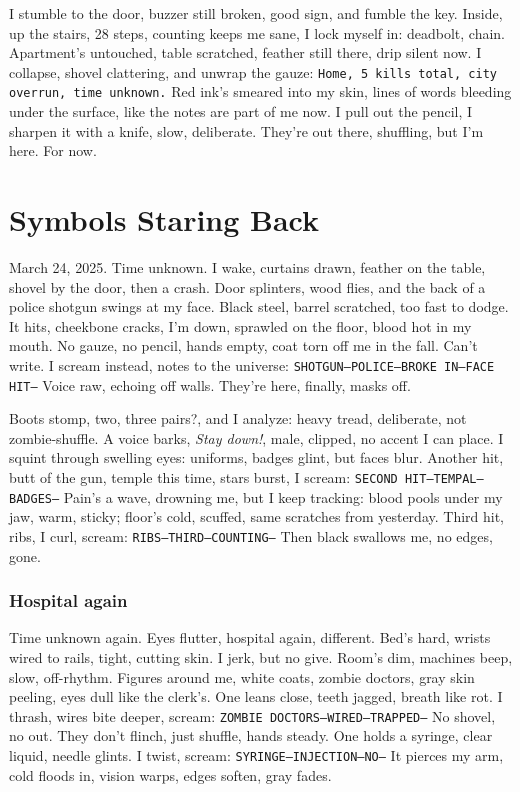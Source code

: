 \documentclass[12pt,oneside]{book}
\newcommand{\note}[1]{\texttt{#1}}
\begin{document}
I stumble to the door, buzzer still broken, good sign, and fumble the key. Inside, up the stairs, 28 steps, counting keeps me sane, I lock myself in: deadbolt, chain. Apartment’s untouched, table scratched, feather still there, drip silent now. I collapse, shovel clattering, and unwrap the gauze: \note{Home, 5 kills total, city overrun, time unknown.} Red ink’s smeared into my skin, lines of words bleeding under the surface, like the notes are part of me now. I pull out the pencil, I sharpen it with a knife, slow, deliberate. They’re out there, shuffling, but I’m here. For now.

\chapter{Symbols Staring Back}

March 24, 2025. Time unknown. I wake, curtains drawn, feather on the table, shovel by the door, then a crash. Door splinters, wood flies, and the back of a police shotgun swings at my face. Black steel, barrel scratched, too fast to dodge. It hits, cheekbone cracks, I’m down, sprawled on the floor, blood hot in my mouth. No gauze, no pencil, hands empty, coat torn off me in the fall. Can’t write. I scream instead, notes to the universe: \note{SHOTGUN—POLICE—BROKE IN—FACE HIT—} Voice raw, echoing off walls. They’re here, finally, masks off.

Boots stomp, two, three pairs?, and I analyze: heavy tread, deliberate, not zombie-shuffle. A voice barks, \textit{Stay down!}, male, clipped, no accent I can place. I squint through swelling eyes: uniforms, badges glint, but faces blur. Another hit, butt of the gun, temple this time, stars burst, I scream: \note{SECOND HIT—TEMPAL—BADGES—} Pain’s a wave, drowning me, but I keep tracking: blood pools under my jaw, warm, sticky; floor’s cold, scuffed, same scratches from yesterday. Third hit, ribs, I curl, scream: \note{RIBS—THIRD—COUNTING—} Then black swallows me, no edges, gone.

\subsection*{Hospital again}

Time unknown again. Eyes flutter, hospital again, different. Bed’s hard, wrists wired to rails, tight, cutting skin. I jerk, but no give. Room’s dim, machines beep, slow, off-rhythm. Figures around me, white coats, zombie doctors, gray skin peeling, eyes dull like the clerk’s. One leans close, teeth jagged, breath like rot. I thrash, wires bite deeper, scream: \note{ZOMBIE DOCTORS—WIRED—TRAPPED—} No shovel, no out. They don’t flinch, just shuffle, hands steady. One holds a syringe, clear liquid, needle glints. I twist, scream: \note{SYRINGE—INJECTION—NO—} It pierces my arm, cold floods in, vision warps, edges soften, gray fades.
\end{document}
